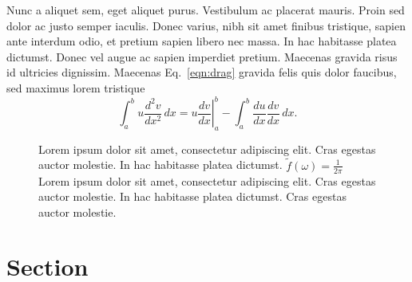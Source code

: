 \documentclass[11pt]{article}
\begin{document}
Nunc a aliquet sem, eget aliquet purus. Vestibulum ac placerat mauris. Proin sed dolor ac justo semper iaculis. Donec varius, nibh sit amet finibus tristique, sapien ante interdum odio, et pretium sapien libero nec massa. In hac habitasse platea dictumst. Donec vel augue ac sapien imperdiet pretium. Maecenas gravida risus id ultricies dignissim. Maecenas Eq.~\ref{eqn:drag} gravida felis quis dolor faucibus, sed maximus lorem tristique
\begin{equation}
\label{eqn:drag}
\int_a^bu\frac{d^2v}{dx^2}\,dx
=\left.u\frac{dv}{dx}\right|_a^b
-\int_a^b\frac{du}{dx}\frac{dv}{dx}\,dx.
\end{equation}
\begin{figure}[h!]
\begin{center}
\caption{{Lorem ipsum dolor sit amet, consectetur adipiscing elit. Cras egestas
auctor molestie. In hac habitasse platea dictumst. \(\tilde f(\omega)=\frac{1}{2\pi}\)
Lorem ipsum dolor sit amet, consectetur adipiscing elit. Cras egestas
auctor molestie. In hac habitasse platea dictumst. Cras egestas auctor
molestie.
{\label{125409}}%
}}
\end{center}
\end{figure}

\section*{Section}
\label{igw}
\end{document}
